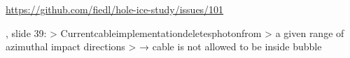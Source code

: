 

\url{https://github.com/fiedl/hole-ice-study/issues/101}


\cite{martinspicehddard}, slide 39:
> Currentcableimplementationdeletesphotonfrom
> a given range of azimuthal impact directions
> → cable is not allowed to be inside bubble